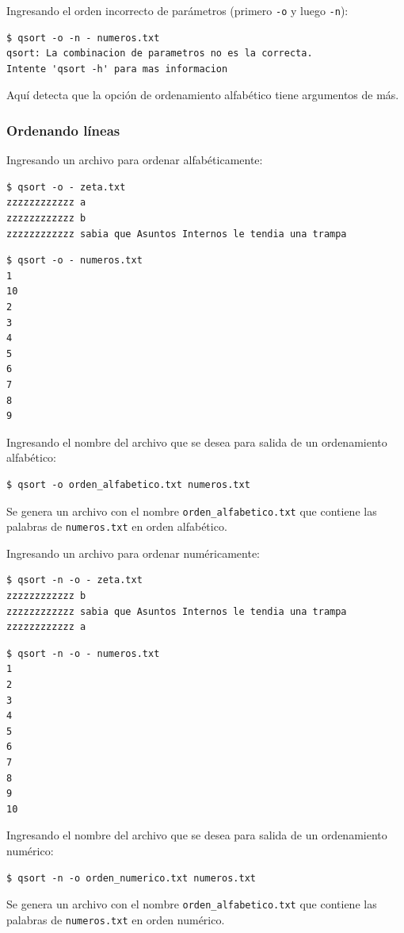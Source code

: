 \documentclass[a4paper, 12pt]{article}
\begin{document}
	Ingresando el orden incorrecto de parámetros (primero \texttt{-o} y luego \texttt{-n}):
	\begin{verbatim}
$ qsort -o -n - numeros.txt
qsort: La combinacion de parametros no es la correcta.
Intente 'qsort -h' para mas informacion
	\end{verbatim}
	Aquí detecta que la opción de ordenamiento alfabético tiene argumentos de más.
	
	
	
	\subsubsection{Ordenando líneas}
	Ingresando un archivo para ordenar alfabéticamente:
	\begin{verbatim}
$ qsort -o - zeta.txt
zzzzzzzzzzzz a
zzzzzzzzzzzz b
zzzzzzzzzzzz sabia que Asuntos Internos le tendia una trampa
	\end{verbatim}
	
	\begin{verbatim}
$ qsort -o - numeros.txt
1
10
2
3
4
5
6
7
8
9
	\end{verbatim}
	
	Ingresando el nombre del archivo que se desea para salida de un ordenamiento alfabético:
	\begin{verbatim}
$ qsort -o orden_alfabetico.txt numeros.txt
	\end{verbatim}
	Se genera un archivo con el nombre \texttt{orden\_alfabetico.txt} que contiene las palabras de \texttt{numeros.txt} en orden alfabético.
	
	\vspace*{12pt}
	Ingresando un archivo para ordenar numéricamente:
	\begin{verbatim}
$ qsort -n -o - zeta.txt
zzzzzzzzzzzz b
zzzzzzzzzzzz sabia que Asuntos Internos le tendia una trampa
zzzzzzzzzzzz a
	\end{verbatim}
	
	\begin{verbatim}
$ qsort -n -o - numeros.txt
1
2
3
4
5
6
7
8
9
10
	\end{verbatim}
	
	Ingresando el nombre del archivo que se desea para salida de un ordenamiento numérico:
	\begin{verbatim}
$ qsort -n -o orden_numerico.txt numeros.txt
	\end{verbatim}
	Se genera un archivo con el nombre \texttt{orden\_alfabetico.txt} que contiene las palabras de \texttt{numeros.txt} en orden numérico.
\end{document}
